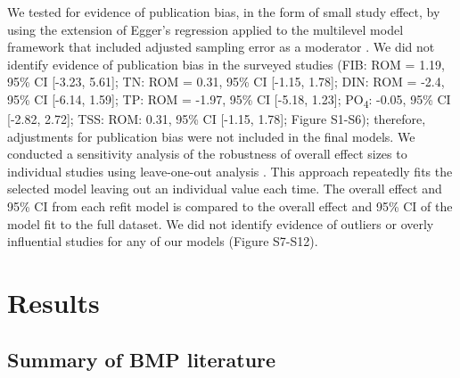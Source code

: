 \documentclass[utf8]{FrontiersinHarvard}
\begin{document}
We tested for evidence of publication bias, in the form of small study effect, by using the extension of Egger's regression applied to the multilevel model framework that included adjusted sampling error as a moderator \citep{nakagawaQuantitativeEvidenceSynthesis2023}.
We did not identify evidence of publication bias in the surveyed studies (FIB: ROM = 1.19, 95\% CI {[}-3.23, 5.61{]}; TN: ROM = 0.31, 95\% CI {[}-1.15, 1.78{]}; DIN: ROM = -2.4, 95\% CI {[}-6.14, 1.59{]}; TP: ROM = -1.97, 95\% CI {[}-5.18, 1.23{]}; PO\textsubscript{4}: -0.05, 95\% CI {[}-2.82, 2.72{]}; TSS: ROM: 0.31, 95\% CI {[}-1.15, 1.78{]}; Figure S1-S6); therefore, adjustments for publication bias were not included in the final models.
We conducted a sensitivity analysis of the robustness of overall effect sizes to individual studies using leave-one-out analysis \citep{nakagawaQuantitativeEvidenceSynthesis2023}.
This approach repeatedly fits the selected model leaving out an individual value each time.
The overall effect and 95\% CI from each refit model is compared to the overall effect and 95\% CI of the model fit to the full dataset.
We did not identify evidence of outliers or overly influential studies for any of our models (Figure S7-S12).

\hypertarget{results}{%
\section{Results}\label{results}}

\hypertarget{summary-of-bmp-literature}{%
\subsection{Summary of BMP literature}\label{summary-of-bmp-literature}}
\end{document}
